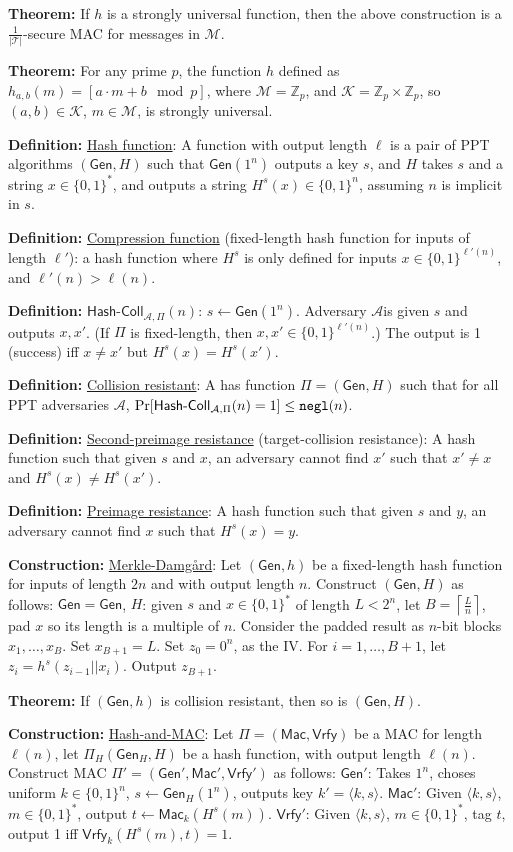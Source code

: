\documentclass[10pt]{article}
\newcommand{\Z}{\mathbb{Z}}
\newcommand{\AAA}{\mathcal{A}}
\newcommand{\KKK}{\mathcal{K}}
\newcommand{\MMM}{\mathcal{M}}
\newcommand{\TTT}{\mathcal{T}}
\newcommand{\defn}[1]{{\bf Definition:} \underline{#1}}
\newcommand{\thm}[1]{{\bf Theorem:} \underline{#1}}
\newcommand{\con}[1]{{\bf Construction:} \underline{#1}}
\newcommand{\Mac}{\mathsf{Mac}}
\newcommand{\Vrfy}{\mathsf{Vrfy}}
\newcommand{\Gen}{\mathsf{Gen}}
\newcommand{\ang}[1]{\langle#1\rangle}
\newcommand{\ExptHCArgs}[2]{\mathsf{Hash\text{-}Coll}_{#1,#2}}
\newcommand{\ExptHC}{\ExptHCArgs{\AAA}{\Pi}}
\newcommand{\negl}{{\tt negl}}
\newcommand{\from}{\leftarrow}
\begin{document}
\begin{multicols}{3}
\thm{}If $h$ is a strongly universal function, then the above construction is a $\frac{1}{|\TTT|}$-secure MAC for messages in $\MMM$.

\thm{}For any prime $p$, the function $h$ defined as $h_{a,b}(m)=[a\cdot m+b\mod{p}]$, where $\MMM=\Z_p$, and $\KKK=\Z_p\times\Z_p$, so $(a,b)\in\KKK$, $m\in\MMM$, is strongly universal.

\defn{Hash function}: A function with output length $\ell$ is a pair of PPT algorithms $(\Gen, H)$ such that $\Gen(1^n)$ outputs a key $s$, and $H$ takes $s$ and a string $x\in\{0,1\}^*$, and outputs a string $H^s(x)\in\{0,1\}^n$, assuming $n$ is implicit in $s$.

\defn{Compression function} (fixed-length hash function for inputs of length $\ell'$): a hash function where $H^s$ is only defined for inputs $x\in\{0,1\}^{\ell'(n)}$, and $\ell'(n)>\ell(n)$.

\defn{$\ExptHC(n)$}: $s\from\Gen(1^n)$. Adversary $\AAA$is given $s$ and outputs $x,x'$. (If $\Pi$ is fixed-length, then $x,x'\in\{0,1\}^{\ell'(n)}$.) The output is 1 (success) iff $x\neq x'$ but $H^s(x)=H^s(x')$.

\defn{Collision resistant}: A has function $\Pi=(\Gen, H)$ such that for all PPT adversaries $\AAA$, $\Pr[\ExptHC(n)=1]\leq\negl(n)$.

\defn{Second-preimage resistance} (target-collision resistance): A hash function such that given $s$ and $x$, an adversary cannot find $x'$ such that $x'\neq x$ and $H^s(x)\neq H^s(x')$.

\defn{Preimage resistance}: A hash function such that given $s$ and $y$, an adversary cannot find $x$ such that $H^s(x)=y$.

\con{Merkle-Damg\r{a}rd}: Let $(\Gen, h)$ be a fixed-length hash function for inputs of length $2n$ and with output length $n$. Construct $(\Gen, H)$ as follows: $\Gen=\Gen$, $H$: given $s$ and $x\in\{0,1\}^*$ of length $L<2^n$, let $B=\left\lceil\frac{L}{n}\right\rceil$, pad $x$ so its length is a multiple of $n$. Consider the padded result as $n$-bit blocks $x_1, \dots,x_B$. Set $x_{B+1}=L$. Set $z_0=0^n$, as the IV. For $i=1,\dots,B+1$, let $z_i=h^s(z_{i-1}||x_i)$. Output $z_{B+1}$.

\thm{}If $(\Gen, h)$ is collision resistant, then so is $(\Gen, H)$.

\con{Hash-and-MAC}: Let $\Pi=(\Mac,\Vrfy)$ be a MAC for length $\ell(n)$, let $\Pi_{H}(\Gen_H,H)$ be a hash function, with output length $\ell(n)$. Construct MAC $\Pi'=(\Gen',\Mac',\Vrfy')$ as follows: $\Gen'$: Takes $1^n$, choses uniform $k\in\{0,1\}^n$, $s\from\Gen_H(1^n)$, outputs key $k'=\ang{k,s}$. $\Mac'$: Given $\ang{k,s}$, $m\in\{0,1\}^*$, output $t\from\Mac_k(H^s(m))$. $\Vrfy'$: Given $\ang{k,s}$, $m\in\{0,1\}^*$, tag $t$, output 1 iff $\Vrfy_k(H^s(m),t)=1$.


\end{multicols}
\end{document}
